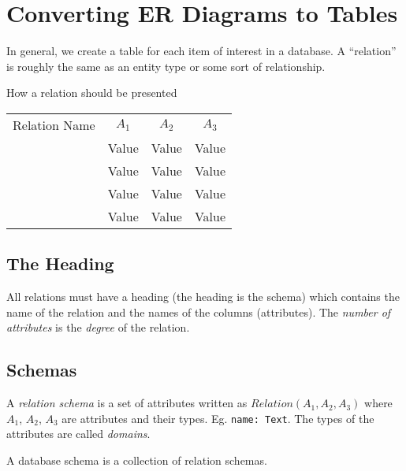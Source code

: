 \section{Converting ER Diagrams to Tables}\label{sec:converting_er_diagrams_to_tables}

In general, we create a table for each item of interest in a database.
A ``relation'' is roughly the same as an entity type or some sort of relationship.

\begin{highlight}{How a relation should be presented}
    \begin{tabular}{cccc}
        \cmidrule{2-4}
        Relation Name & \(A_1\) & \(A_2\) & \(A_3\) \\
        \cmidrule{2-4}
                      & Value   & Value   & Value   \\
        \cmidrule{2-4}
                      & Value   & Value   & Value   \\
        \cmidrule{2-4}
                      & Value   & Value   & Value   \\
        \cmidrule{2-4}
                      & Value   & Value   & Value   \\
        \cmidrule{2-4}
    \end{tabular}
\end{highlight}


\subsection{The Heading}\label{sub:the_heading}

All relations must have a heading (the heading is the schema) which contains the name of the relation and the names of the columns (attributes).
The \emph{number of attributes} is the \emph{degree} of the relation.

\subsection{Schemas}\label{sub:schemas}

A \emph{relation schema} is a set of attributes written as \(Relation(A_1, A_2, A_3)\) where \(A_1\), \(A_2\), \(A_3\) are attributes and their types. Eg. \texttt{name: Text}. The types of the attributes are called \emph{domains}.

\begin{note}
    A database schema is a collection of relation schemas.
\end{note}

